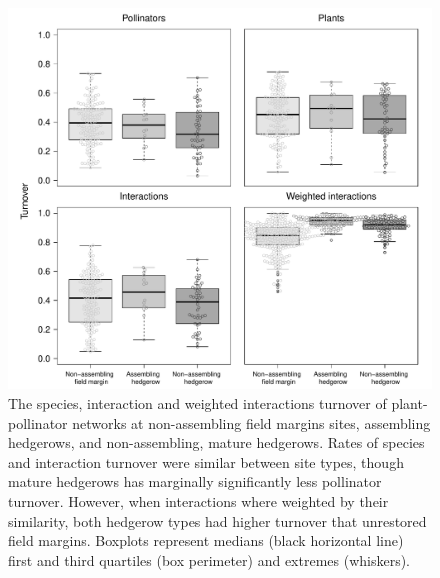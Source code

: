 \documentclass[12pt]{article}
\begin{document}
\begin{figure}
  \centering
  \includegraphics[width=.8\textwidth]{../analysis/variability/figures/turnover_panels.pdf}
  \caption{The species, interaction and weighted interactions turnover
    of plant-pollinator networks at non-assembling field margins
    sites, assembling hedgerows, and non-assembling, mature
    hedgerows. Rates of species and interaction turnover were similar
    between site types, though mature hedgerows has marginally
    significantly less pollinator turnover.  However, when
    interactions where weighted by their similarity, both hedgerow
    types had higher turnover that unrestored field margins. Boxplots
    represent medians (black horizontal line) first and third
    quartiles (box perimeter) and extremes (whiskers). }
  \label{fig:beta}
\end{figure}
\clearpage
\end{document}
